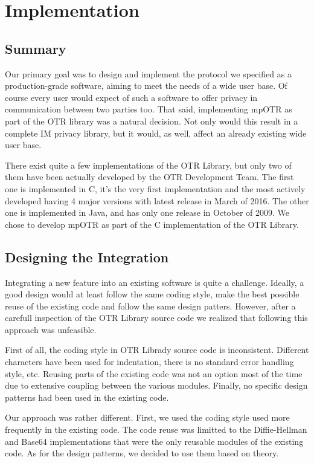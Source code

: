 \chapter{Implementation}
\label{chapter:implementation}


\section{Summary}
Our primary goal was to design and implement the protocol we specified as a production-grade software, aiming to meet the needs of a wide user base. Of course every user would expect of such a software to offer privacy in communication between two parties too. That said, implementing mpOTR as part of the OTR library was a natural decision. Not only would this result in a complete IM privacy library, but it would, as well, affect an already existing wide user base.

There exist quite a few implementations of the OTR Library, but only two of them have been actually developed by the OTR Development Team. The first one is implemented in C, it's the very first implementation and the most actively developed having 4 major versions with latest release in March of 2016. The other one is implemented in Java, and has only one release in October of 2009. We chose to develop mpOTR as part of the C implementation of the OTR Library.


\section{Designing the Integration}
Integrating a new feature into an existing software is quite a challenge. Ideally, a good design would at least follow the same coding style, make the best possible reuse of the existing code and follow the same design patters. However, after a carefull inspection of the OTR Library source code we realized that following this approach was unfeasible.

First of all, the coding style in OTR Librady source code is inconsistent. Different characters have been used for indentation, there is no standard error handling style, etc. Reusing parts of the existing code was not an option most of the time due to extensive coupling between the various modules. Finally, no specific design patterns had been used in the existing code.

Our approach was rather different. First, we used the coding style used more frequently in the existing code. The code reuse was limitted to the Diffie-Hellman and Base64 implementations that were the only reusable modules of the existing code. As for the design patterns, we decided to use them based on theory.


